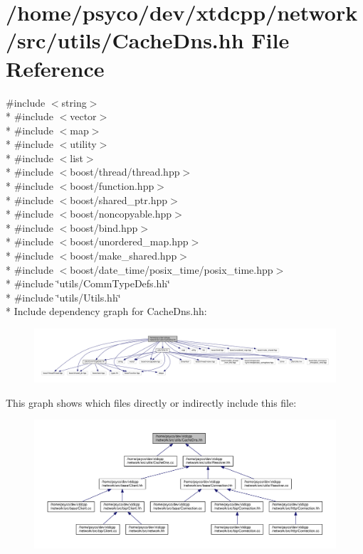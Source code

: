 \hypertarget{CacheDns_8hh}{}\section{/home/psyco/dev/xtdcpp/network/src/utils/\+Cache\+Dns.hh File Reference}
\label{CacheDns_8hh}
{\ttfamily \#include $<$string$>$}\\*
{\ttfamily \#include $<$vector$>$}\\*
{\ttfamily \#include $<$map$>$}\\*
{\ttfamily \#include $<$utility$>$}\\*
{\ttfamily \#include $<$list$>$}\\*
{\ttfamily \#include $<$boost/thread/thread.\+hpp$>$}\\*
{\ttfamily \#include $<$boost/function.\+hpp$>$}\\*
{\ttfamily \#include $<$boost/shared\+\_\+ptr.\+hpp$>$}\\*
{\ttfamily \#include $<$boost/noncopyable.\+hpp$>$}\\*
{\ttfamily \#include $<$boost/bind.\+hpp$>$}\\*
{\ttfamily \#include $<$boost/unordered\+\_\+map.\+hpp$>$}\\*
{\ttfamily \#include $<$boost/make\+\_\+shared.\+hpp$>$}\\*
{\ttfamily \#include $<$boost/date\+\_\+time/posix\+\_\+time/posix\+\_\+time.\+hpp$>$}\\*
{\ttfamily \#include \char`\"{}utils/\+Comm\+Type\+Defs.\+hh\char`\"{}}\\*
{\ttfamily \#include \char`\"{}utils/\+Utils.\+hh\char`\"{}}\\*
Include dependency graph for Cache\+Dns.\+hh\+:
\nopagebreak
\begin{figure}[H]
\begin{center}
\leavevmode
\includegraphics[width=350pt]{CacheDns_8hh__incl}
\end{center}
\end{figure}
This graph shows which files directly or indirectly include this file\+:
\nopagebreak
\begin{figure}[H]
\begin{center}
\leavevmode
\includegraphics[width=350pt]{CacheDns_8hh__dep__incl}
\end{center}
\end{figure}
